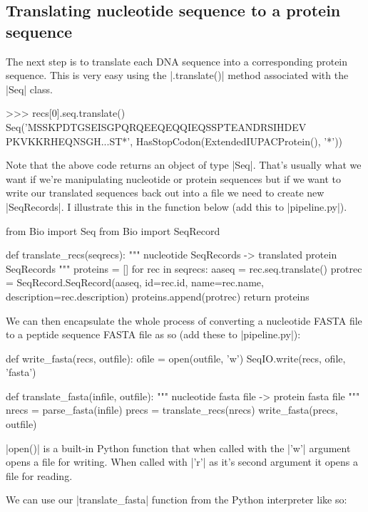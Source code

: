 \subsection{Translating nucleotide sequence to a protein sequence}

The next step is to translate each  DNA sequence into a corresponding protein sequence. This is very easy using the |.translate()| method associated with the |Seq| class.

\begin{python}
>>> recs[0].seq.translate()
Seq('MSSKPDTGSEISGPQRQEEQEQQIEQSSPTEANDRSIHDEV
PKVKKRHEQNSGH...ST*', HasStopCodon(ExtendedIUPACProtein(), '*'))
\end{python}
%
Note that the above code returns an object of type |Seq|. That's usually what we want if we're manipulating nucleotide or protein sequences but if we want to write our translated sequences back out into a file we need to create new |SeqRecords|. I illustrate this in the function below (add this to |pipeline.py|).

\begin{python}
from Bio import Seq
from Bio import SeqRecord

def translate_recs(seqrecs):
    """ nucleotide SeqRecords -> translated protein SeqRecords """
    proteins = []
    for rec in seqrecs:
        aaseq = rec.seq.translate()
        protrec = SeqRecord.SeqRecord(aaseq, id=rec.id, name=rec.name,
        			      description=rec.description)
        proteins.append(protrec)
    return proteins
\end{python}

We can then encapsulate the whole process of converting a nucleotide FASTA file to a peptide sequence FASTA file as so (add these to |pipeline.py|):

\begin{python}
def write_fasta(recs, outfile):
    ofile = open(outfile, 'w')
    SeqIO.write(recs, ofile, 'fasta')

def translate_fasta(infile, outfile):
    """ nucleotide fasta file -> protein fasta file """
    nrecs = parse_fasta(infile)
    precs = translate_recs(nrecs)
    write_fasta(precs, outfile)
\end{python}

|open()| is a built-in Python function that when called with the |'w'| argument opens a file for writing. When called with |'r'| as it's second argument it opens a file for reading.

We can use our |translate_fasta| function from the Python interpreter like so:

